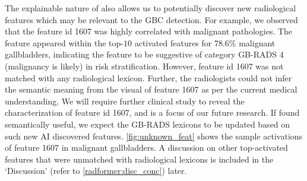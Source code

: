 The explainable nature of \radformer also allows us to potentially discover new radiological features which may be relevant to the GBC detection. For example, we observed that the feature id 1607 was highly correlated with malignant pathologies. The feature appeared within the top-$10$ activated features for 78.6\% malignant gallbladders, indicating the feature to be suggestive of category GB-RADS 4 (malignancy is likely) in risk stratification. However, feature id 1607 was not matched with any radiological lexicon. Further, the radiologists could not infer the semantic meaning from the visual of feature 1607 as per the current medical understanding. We will require further clinical study to reveal the characterization of feature id 1607, and is a focus of our future research. If found semantically useful, we expect the GB-RADS lexicons to be updated based on such new AI discovered features. \cref{fig:unknown_feat} shows the sample activations of feature 1607 in malignant gallbladders.
A discussion on other top-activated features that were unmatched with radiological lexicons is included in the `Discussion' (refer to \cref{radformer:disc_conc}) later.

